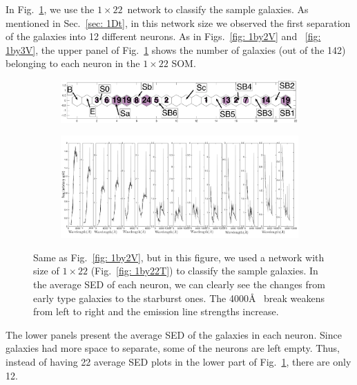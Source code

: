             In Fig.~\ref{fig: 1by22V}, we use the $1\times22$~network to classify the sample galaxies.
            As mentioned in Sec.~\ref{sec: 1Dt}, in this network size we observed the first separation of the  galaxies into 12 different neurons.
           As in Figs.~\ref{fig: 1by2V} and ~\ref{fig: 1by3V}, the upper panel of Fig.~\ref{fig: 1by22V} shows the number of galaxies (out of the 142) belonging to each neuron in the $1\times22$ SOM.
            \begin{figure}
                \begin{subfigure}[b]{0.9\textwidth}
                    \centering
                    \includegraphics[width=\textwidth]{../image_paper2/1d/hit_v_1_by_22_n.png}
                \end{subfigure}
                \hfill
                \begin{subfigure}[b]{0.9\textwidth}
                     \includegraphics[width=\textwidth]{../image_paper2/1d/SED_total1by22.png}
                \end{subfigure}
                \caption{Same as Fig.~\ref{fig: 1by2V}, but in this figure, we used a network with size of $1\times22$ (Fig.~\ref{fig: 1by22T}) to classify the sample galaxies. In the average SED of each neuron, we can clearly see the changes from early type galaxies to the starburst ones. The 4000\AA~ break weakens from left to right and the emission line strengths increase.}
                \label{fig: 1by22V}
            \end{figure}
            The lower panels present the average SED of the galaxies in each neuron.
            Since galaxies had more space to separate, some of the neurons are left empty.
            Thus, instead of having 22 average SED plots in the lower part of Fig.~\ref{fig: 1by22V}, there are only 12.
            

